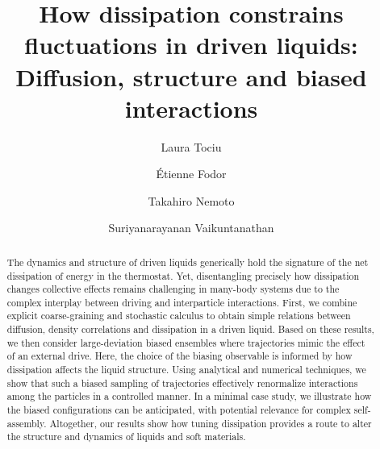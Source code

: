 \documentclass[superscriptaddress, twocolumn, prx, longbibliography, nofootinbib]{revtex4-1}
\begin{document}
\title{How dissipation constrains fluctuations in driven liquids:\\Diffusion, structure and biased interactions}
\author{Laura Tociu}

\author{\'Etienne Fodor}

\author{Takahiro Nemoto}

\author{Suriyanarayanan Vaikuntanathan}

\begin{abstract}

The dynamics and structure of driven liquids generically hold the signature of the net dissipation of energy in the thermostat. Yet, disentangling precisely how dissipation changes collective effects remains challenging in many-body systems due to the complex interplay between driving and interparticle interactions. First, we combine explicit coarse-graining and stochastic calculus to obtain simple relations between diffusion, density correlations and dissipation in a driven liquid. Based on these results, we then consider large-deviation biased ensembles where trajectories mimic the effect of an external drive. Here, the choice of the biasing observable is informed by how dissipation affects the liquid structure. Using analytical and numerical techniques, we show that such a biased sampling of trajectories effectively renormalize interactions among the particles in a controlled manner. In a minimal case study, we illustrate how the biased configurations can be anticipated, with potential relevance for complex self-assembly. Altogether, our results show how tuning dissipation provides a route to alter the structure and dynamics of liquids and soft materials.

\end{abstract}

\maketitle 
\end{document}
